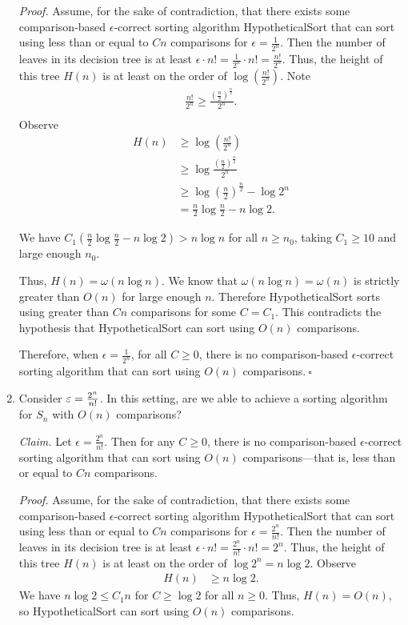 \begin{enumerate}[resume]
\begin{solution}
\textit{Proof. }Assume, for the sake of contradiction, that there exists some comparison-based $\epsilon$-correct sorting algorithm {\sc HypotheticalSort} that can sort using less than or equal to $Cn$ comparisons for $\epsilon=\frac{1}{2^n}$. Then the number of leaves in its decision tree is at least $\epsilon\cdot n!=\frac{1}{2^n}\cdot n!=\frac{n!}{2^n}$. Thus, the height of this tree $H(n)$ is at least on the order of $\log\left(\frac{n!}{2^n}\right)$. Note
\begin{align*}
\frac{n!}{2^n}\geq\frac{\left(\frac{n}{2}\right)^{\frac{n}{2}}}{2^n}.\\
\end{align*}
Observe
\begin{align*}
H(n)&\geq\log\left(\frac{n!}{2^n}\right)\\
&\geq\log\frac{\left(\frac{n}{2}\right)^{\frac{n}{2}}}{2^n}\\
&\geq\log\left(\frac{n}{2}\right)^{\frac{n}{2}}-\log2^n\\
&=\frac{n}{2}\log\frac{n}{2}-n\log 2.
\end{align*}

We have $C_1\left(\frac{n}{2}\log\frac{n}{2}-n\log 2\right)>n\log n$ for all $n\geq n_0$, taking $C_1\geq 10$ and large enough $n_0$.

Thus, $H(n)=\omega(n\log n)$. We know that $\omega(n\log n)=\omega(n)$ is strictly greater than $O(n)$ for large enough $n$. Therefore {\sc HypotheticalSort} sorts using greater than $Cn$ comparisons for some $C=C_1$. This contradicts the hypothesis that {\sc HypotheticalSort} can sort using $O(n)$ comparisons.

Therefore, when $\epsilon=\frac{1}{2^n}$, for all $C\geq 0$, there is no comparison-based $\epsilon$-correct sorting algorithm that can sort using $O(n)$ comparisons.$~\square$
\end{solution}
\newpage 
    \item Consider $\varepsilon=\frac{2^n}{n!}$. In this setting, are we able to achieve a sorting algorithm for $S_n$ with $O(n)$ comparisons?
\begin{solution}
\textit{Claim. }Let $\epsilon=\frac{2^n}{n!}$. Then for any $C\geq 0$, there is no comparison-based $\epsilon$-correct sorting algorithm that can sort using $O(n)$ comparisons---that is, less than or equal to $Cn$ comparisons.

\textit{Proof. }Assume, for the sake of contradiction, that there exists some comparison-based $\epsilon$-correct sorting algorithm {\sc HypotheticalSort} that can sort using less than or equal to $Cn$ comparisons for $\epsilon=\frac{2^n}{n!}$. Then the number of leaves in its decision tree is at least $\epsilon\cdot n!=\frac{2^n}{n!}\cdot n!=2^n$. Thus, the height of this tree $H(n)$ is at least on the order of $\log 2^n=n\log 2$. Observe
\begin{align*}
H(n)&\geq n\log 2.
\end{align*}
We have $n\log{2}\leq C_1n$ for $C\geq\log{2}$ for all $n\geq 0$. Thus, $H(n)=O(n)$, so {\sc HypotheticalSort} can sort using $O(n)$ comparisons.


\end{solution}
\end{enumerate}
